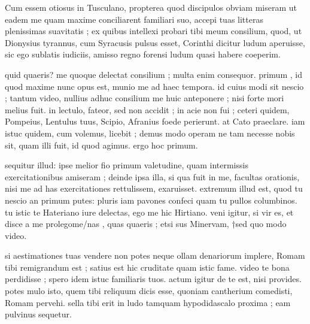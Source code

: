 


 Cum essem otiosus in Tusculano, propterea quod discipulos obviam miseram ut eadem me quam maxime conciliarent familiari suo, accepi tuas litteras plenissimas suavitatis ; ex quibus intellexi probari tibi meum consilium, quod, ut Dionysius tyrannus, cum Syracusis pulsus esset, Corinthi dicitur ludum aperuisse, sic ego sublatis iudiciis, amisso regno forensi ludum quasi habere coeperim.

 quid quaeris? me quoque delectat consilium ; multa enim consequor. primum , id quod maxime nunc opus est, munio me ad haec tempora. id cuius modi sit nescio ; tantum video, nullius adhuc consilium me huic anteponere ; nisi forte mori melius fuit. in lectulo, fateor, sed non accidit ; in acie non fui ; ceteri quidem, Pompeius, Lentulus tuus, Scipio, Afranius foede perierunt. at Cato praeclare. iam istuc quidem, cum volemus, licebit ; demus modo operam ne tam necesse nobis sit, quam illi fuit, id quod agimus. ergo hoc primum.

 sequitur illud: ipse melior fio primum valetudine, quam intermissis exercitationibus amiseram ; deinde ipsa illa, si qua fuit in me, facultas orationis, nisi me ad has exercitationes rettulissem, exaruisset. extremum illud est, quod tu nescio an primum putes: pluris iam pavones confeci quam tu pullos columbinos. tu istic te Hateriano iure delectas, ego me hic Hirtiano. veni igitur, si vir es, et disce a me prolegome/nas , quas quaeris ; etsi sus Minervam, †sed quo modo video.

 si aestimationes tuas vendere non potes neque ollam denariorum implere, Romam tibi remigrandum est ; satius est hic cruditate quam istic fame. video te bona perdidisse ; spero idem istuc familiaris tuos. actum igitur de te est, nisi provides. potes mulo isto, quem tibi reliquum dicis esse, quoniam cantherium comedisti, Romam pervehi. sella tibi erit in ludo tamquam hypodidascalo proxima ; eam pulvinus sequetur.
